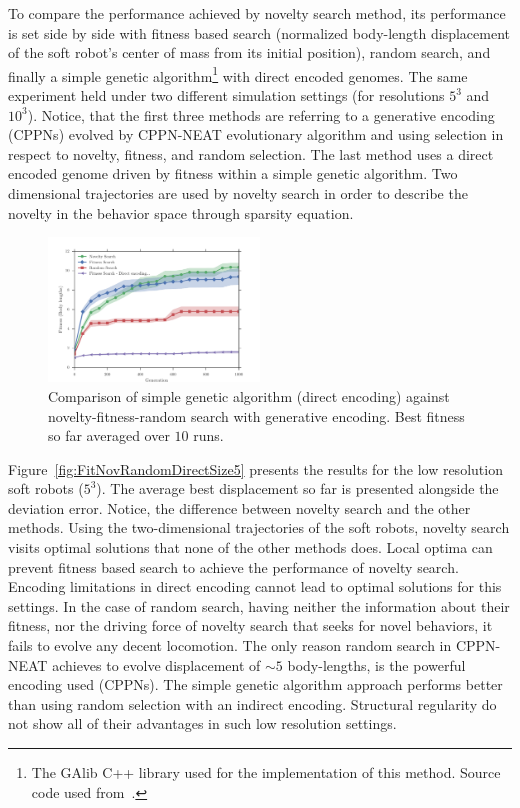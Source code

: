 \documentclass{sig-alternate}
\begin{document}
To compare the performance achieved by novelty search method, its performance is set side by side with fitness based search (normalized body-length displacement of the soft robot's center of mass from its initial position), random search, and finally a simple genetic algorithm\footnote{The GAlib C++ library \cite{wall1996galib} used for the implementation of this method. Source code used from~\cite{cheney2013unshackling}.} with direct encoded genomes. The same experiment held under two different simulation settings (for resolutions $5^3$ and $10^3$). Notice, that the first three methods are referring to a generative encoding (CPPNs) evolved by CPPN-NEAT evolutionary algorithm and using selection in respect to novelty, fitness, and random selection. The last method uses a direct encoded genome driven by fitness within a simple genetic algorithm. Two dimensional trajectories are used by novelty search in order to describe the novelty in the behavior space through sparsity equation.

\begin{figure}[t!]
\centering
\includegraphics[width=0.5\textwidth]{../Figures/Results/FitvsNovVsDirSize10.pdf}
\caption{Comparison of simple genetic algorithm (direct encoding) against novelty-fitness-random search with generative encoding. Best fitness so far averaged over $10$ runs.}
\label{fig:FitvsNovVsDirSize10}
\vspace{-15pt}
\end{figure} 

Figure~\ref{fig:FitNovRandomDirectSize5} presents the results for the low resolution soft robots ($5^3$). The average best displacement so far is presented alongside the deviation error. Notice, the difference between novelty search and the other methods. Using the two-dimensional trajectories of the soft robots, novelty search visits optimal solutions that none of the other methods does. Local optima can prevent fitness based search to achieve the performance of novelty search. Encoding limitations in direct encoding cannot lead to optimal solutions for this settings. In the case of random search, having neither the information about their fitness, nor the driving force of novelty search that seeks for novel behaviors, it fails to evolve any decent locomotion. The only reason random search in CPPN-NEAT achieves to evolve displacement of $\sim 5$ body-lengths, is the powerful encoding used (CPPNs). The simple genetic algorithm approach performs better than using random selection with an indirect encoding. Structural regularity do not show all of their advantages in such low resolution settings.
\end{document}
